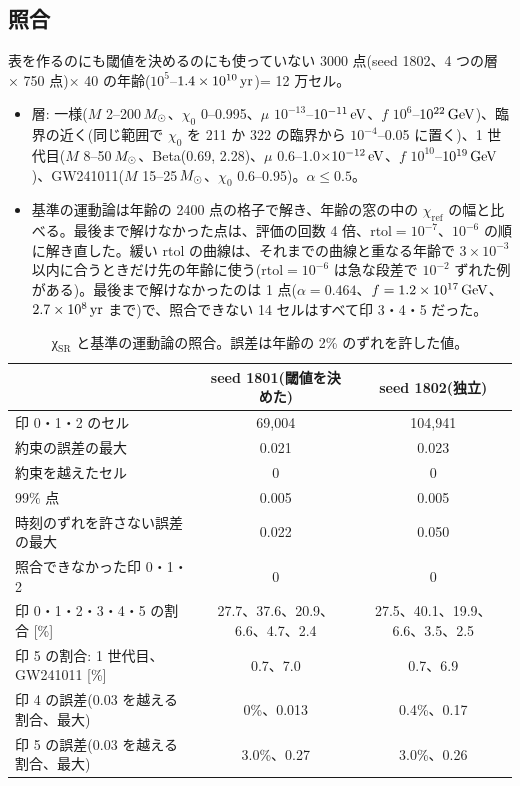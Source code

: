 \subsection{照合}

表を作るのにも閾値を決めるのにも使っていない 3000 点(seed 1802、4 つの層 × 750 点)× 40 の年齢($10^5$--$1.4\times10^{10}\,\mathrm{yr}$)= 12 万セル。
\begin{itemize}
\item 層: 一様($M$ 2--200$\,M_\odot$、$\chi_0$ 0--0.995、$\mu$ $10^{-13}$--$10^{-11}\,\mathrm{eV}$、$f$ $10^6$--$10^{22}\,\mathrm{GeV}$)、臨界の近く(同じ範囲で $\chi_0$ を 211 か 322 の臨界から $10^{-4}$--0.05 に置く)、1 世代目($M$ 8--50$\,M_\odot$、Beta(0.69, 2.28)、$\mu$ 0.6--1.0$\times10^{-12}\,\mathrm{eV}$、$f$ $10^{10}$--$10^{19}\,\mathrm{GeV}$)、GW241011($M$ 15--25$\,M_\odot$、$\chi_0$ 0.6--0.95)。$\alpha\le0.5$。
\item 基準の運動論は年齢の 2400 点の格子で解き、年齢の窓の中の $\chi_\mathrm{ref}$ の幅と比べる。最後まで解けなかった点は、評価の回数 4 倍、$\mathrm{rtol}=10^{-7}$、$10^{-6}$ の順に解き直した。緩い rtol の曲線は、それまでの曲線と重なる年齢で $3\times10^{-3}$ 以内に合うときだけ先の年齢に使う($\mathrm{rtol}=10^{-6}$ は急な段差で $10^{-2}$ ずれた例がある)。最後まで解けなかったのは 1 点($\alpha=0.464$、$f=1.2\times10^{17}\,\mathrm{GeV}$、$2.7\times10^8\,\mathrm{yr}$ まで)で、照合できない 14 セルはすべて印 3・4・5 だった。
\end{itemize}

\begin{table}[H]
\centering\small
\begin{tabular}{lcc}
\toprule
 & seed 1801(閾値を決めた) & seed 1802(独立)\\
\midrule
印 0・1・2 のセル & 69,004 & 104,941\\
約束の誤差の最大 & 0.021 & 0.023\\
約束を越えたセル & 0 & 0\\
99\% 点 & 0.005 & 0.005\\
時刻のずれを許さない誤差の最大 & 0.022 & 0.050\\
照合できなかった印 0・1・2 & 0 & 0\\
印 0・1・2・3・4・5 の割合 [\%] & 27.7、37.6、20.9、6.6、4.7、2.4 & 27.5、40.1、19.9、6.6、3.5、2.5\\
印 5 の割合: 1 世代目、GW241011 [\%] & 0.7、7.0 & 0.7、6.9\\
印 4 の誤差(0.03 を越える割合、最大) & 0\%、0.013 & 0.4\%、0.17\\
印 5 の誤差(0.03 を越える割合、最大) & 3.0\%、0.27 & 3.0\%、0.26\\
\bottomrule
\end{tabular}
\caption{χ$_\mathrm{SR}$ と基準の運動論の照合。誤差は年齢の 2\% のずれを許した値。}
\label{tab:e18val}
\end{table}


